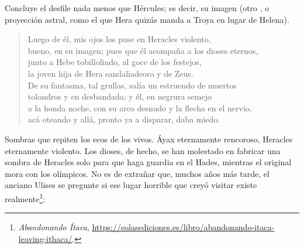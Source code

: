 Concluye el desfile nada menos que Hércules; es decir, su imagen (otro , o proyección astral, como el que Hera quizás manda a Troya en lugar de Helena).

\begin{verse}
Luego de él, mis ojos los puse en Heracles violento,\\
bueno, en su imagen; pues que él acompaña a los dioses eternos,\\
junto a Hebe tobillolindo, al goce de los festejos,\\
la joven hija de Hera sandaliadeoro y de Zeus.\\
De su fantasma, tal grullas, salía un estruendo de muertos\\
tolondros y en desbandada; y él, en negrura semejo\\
a la honda noche, con su arco desnudo y la flecha en el nervio,\\
acá oteando y allá, pronto ya a disparar, daba miedo.
\end{verse}

Sombras que repiten los ecos de los vivos. Áyax eternamente rencoroso, Heracles eternamente violento. Los dioses, de hecho, se han molestado en fabricar una sombra de Heracles solo para que haga guardia en el Hades, mientras el original mora con los olímpicos. No es de extrañar que, muchos años más tarde, el anciano Ulises se pregunte si ese lugar horrible que creyó visitar existe realmente\footnote{\emph{Abandonando Ítaca}, \url{https://eolasediciones.es/libro/abandonando-itaca-leaving-ithaca/}.}:

